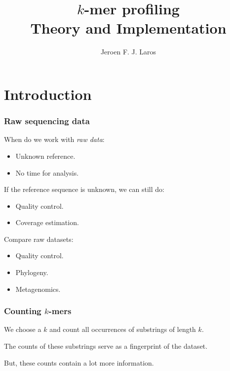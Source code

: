 \documentclass[slidestop]{beamer}
\title{$k$-mer profiling\\
  {\small Theory and Implementation}}
\author{Jeroen F. J. Laros}
\begin{document}

\bodytemplate

\section{Introduction}
\begin{frame}
  \frametitle{Raw sequencing data}

  When do we work with \emph{raw data}:
  \begin{itemize}
    \item Unknown reference.
    \item No time for analysis.
  \end{itemize}
  \bigskip
  \pause

  If the reference sequence is unknown, we can still do:
  \begin{itemize}
    \item Quality control.
    \item Coverage estimation.
  \end{itemize}
  \bigskip
  \pause

  Compare raw datasets:
  \begin{itemize}
    \item Quality control.
    \item Phylogeny.
    \item Metagenomics.
  \end{itemize}
\end{frame}

\begin{frame}
  \frametitle{Counting $k$-mers}

  We choose a $k$ and count all occurrences of substrings of length $k$.
  \bigskip
  \pause

  The counts of these substrings serve as a fingerprint of the dataset.
  \bigskip
  \pause

  But, these counts contain a lot more information.
\end{frame}
\end{document}
